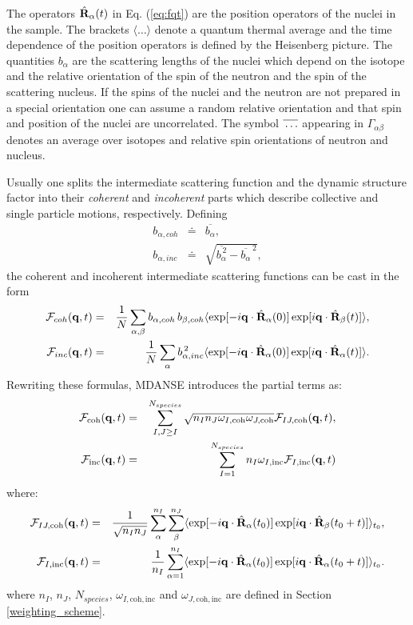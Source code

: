 \documentclass[a4paper,11pt]{article}
\begin{document}
The operators $\hat {\bf R}_\alpha(t)$ in Eq. (\ref{eq:fqt}) are the position operators of the nuclei in the sample. 
The brackets $\langle\ldots\rangle$ denote a quantum thermal average and the time dependence of the position operators 
is defined by the Heisenberg picture.  The quantities $b_\alpha$ are the scattering lengths of the nuclei which depend 
on the isotope and the relative orientation of the spin of the neutron and the spin of the scattering nucleus. If the
spins of the nuclei and the neutron are not prepared in a special orientation one can assume a random relative orientation 
and that spin and position of the nuclei are uncorrelated. The symbol 
$\overline{\rule{0pt}{5pt}\ldots}$ appearing in $\Gamma_{\alpha\beta}$ denotes an average over isotopes and relative spin 
orientations of neutron and nucleus.

Usually one splits the intermediate scattering function and the dynamic structure factor into their {\em coherent} and 
{\em incoherent} parts which describe collective and single particle motions, respectively.
Defining
\begin{eqnarray}
b_{\alpha,coh} &\doteq &\overline{b_\alpha},\\ b_{\alpha,inc} &\doteq
&\sqrt{ \overline{b_\alpha^{\,2}} - \overline{b_\alpha}^{\,2} },
\end{eqnarray}
the coherent and incoherent intermediate scattering functions can be cast in the form
\begin{eqnarray}
{\cal F}_{coh}({\bf q},t) &= &\frac{1}{N}\sum_{\alpha,\beta}
b_{\alpha,coh}\,b_{\beta,coh}
\langle\exp[-i{\bf q}\cdot\hat{\bf R}_\alpha(0)]
       \exp[i{\bf q}\cdot\hat{\bf R}_\beta(t)]\rangle,\\
{\cal F}_{inc}({\bf q},t) &= &\frac{1}{N}\sum_{\alpha}
b_{\alpha,inc}^{\,2}
\langle\exp[-i{\bf q}\cdot\hat{\bf R}_\alpha(0)]
       \exp[i{\bf q}\cdot\hat{\bf R}_\alpha(t)]\rangle.
\end{eqnarray}
Rewriting these formulas, \gls{MDANSE} introduces the partial terms as:
\begin{eqnarray}
\label{eq:fcoh}
{\cal F}_{\mathrm{coh}}({\bf q},t) &= & \sum^{N_{species}}_{I,J \geq I}\sqrt{n_I n_J\omega_{I,\mathrm{coh}}\omega_{J,\mathrm{coh}}}{\cal F}_{IJ,\mathrm{coh}}({\bf q},t),\\
\label{eq:finc}
{\cal F}_{\mathrm{inc}}({\bf q},t) &= &\sum^{N_{species}}_{I = 1}n_I \omega_{I,\mathrm{inc}}{\cal F}_{I,\mathrm{inc}}({\bf q},t)
\end{eqnarray}
where:
\begin{eqnarray}
{\cal F}_{IJ,\mathrm{coh}}({\bf q},t) &= &\frac{1}{\sqrt{n_In_J}}\sum^{n_I}_{\alpha}\sum^{n_J}_{\beta}
\langle\exp[-i{\bf q}\cdot\hat{\bf R}_\alpha(t_0)]
       \exp[i{\bf q}\cdot\hat{\bf R}_\beta(t_0+t)]\rangle_{t_0},\\
{\cal F}_{I,\mathrm{inc}}({\bf q},t) &= & \frac{1}{n_I}\sum^{n_I}_{\alpha = 1}\langle\exp[-i{\bf q}
\cdot\hat{\bf R}_\alpha(t_0)]\exp[i{\bf q}\cdot\hat{\bf R}_\alpha(t_0+t)]\rangle_{t_0}.
\end{eqnarray}
where $n_I$, $n_J$, $N_{species}$, $\omega_{I,\mathrm{coh,inc}}$ and $\omega_{J,\mathrm{coh,inc}}$ are defined in 
Section \ref{weighting_scheme}.
\end{document}

